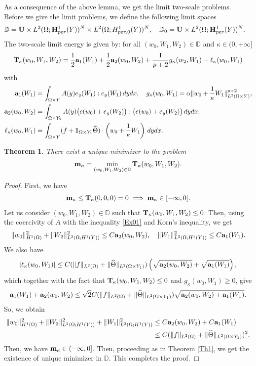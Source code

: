 \documentclass[11pt,a4paper]{article}
\numberwithin{equation}{section}
\def\1{{\bf 1}}
\def\O{\Omega}
\def\Ga{{\bf a}}
\def\D{{\mathbb{D}}}
\def\wh{\widehat }
\def\wt{\widetilde }
\def\X{\times }
\def\Ga{{\bf a}}
\def\Gm{{\bf m}}
\def\GH{{\bf H}}
\def\GT{{\bf T}}
\def\GU{{\bf U}}
\newtheorem{theorem}{Theorem}[section]
\begin{document}
As a consequence of the above lemma, we get the limit two-scale problems. Before we give the limit problems, we define the following limit spaces
\begin{equation*}
	\begin{aligned}
		&\D=\GU\X L^2(\O;\GH^1_{per}(Y))^N\X L^2(\O; H^1_{per,0}(Y))^N,\quad \D_0=\GU \X L^2(\O;\GH^1_{per}(Y))^N.
	\end{aligned}
\end{equation*}
The two-scale limit energy is given by: for all $(w_0,W_1,W_2)\in\D$ and $\kappa\in(0,+\infty]$
\begin{equation}\label{EXE01}
	\GT_\kappa(w_0,W_1,W_2)={1\over 2}\Ga_1(W_1)+{1\over 2}\Ga_2(w_0,W_2)+{1\over p+2}g_\kappa(w_2,W_1)-\ell_\kappa(w_0,W_1)
\end{equation}
with
$$\begin{aligned}
	\Ga_1(W_1)&=\int_{\O\X Y}A(y)e_y(W_1):e_y(W_1)\,dydx,\quad 	g_\kappa(w_0,W_1)=\alpha\|w_0+{1\over \kappa}W_1\|^{p+2}_{L^2(\O\X Y)},\\
	\Ga_2(w_0,W_2)&=\int_{\O\X Y_2} A(y)\big(e(w_0)+e_y(W_2)\big):\big(e(w_0)+e_y(W_2)\big)\,dy dx,\\
	\ell_\kappa(w_0,W_1)&=\int_{\O\X Y}(f+\1_{\O\X Y_1}\wh\Theta)\cdot \left(w_0+{1\over \kappa} W_1\right)\,dydx.
\end{aligned}$$
\begin{theorem}\label{Th3}
	There exist a unique minimizer to the problem
	$$\Gm_\kappa=\min_{(w_0,W_1,W_2)\in\D}\GT_\kappa(w_0,W_1,W_2).$$
\end{theorem}
\begin{proof}
	First, we have
	$$\Gm_\kappa\leq \GT_\kappa(0,0,0)=0 \implies \Gm_\kappa\in[-\infty,0].$$
	Let us consider $(w_0,W_1,W_2)\in \D$ such that $\GT_\kappa(w_0,W_1,W_2)\leq 0$. Then, using the coercivity of $A$ with the inequality \eqref{Ex01} and Korn's inequality, we get
	$$ \|w_0\|^2_{H^1(\O)}+\|W_2\|^2_{L^2(\O;H^1(Y))}\leq C\Ga_2(w_0,W_2),\quad \|W_1\|^2_{L^2(\O;H^1(Y))}\leq C\Ga_1(W_1).$$
	We also have
	$$| \ell_\kappa(w_0,W_1)|\leq C(\|f\|_{L^2(\O)}+\|\wh\Theta\|_{L^2(\O\X Y_1)})\left(\sqrt{\Ga_2(w_0,W_2)}+\sqrt{\Ga_1(W_1)}\right),$$
	which together with the fact that $\GT_\kappa(w_0,W_1,W_2)\leq 0$ and $g_\kappa(w_0,W_1)\geq0$, give
	$$\Ga_1(W_1)+\Ga_2(w_0,W_2)\leq \sqrt{2}C(\|f\|_{L^2(\O)}+\|\wh\Theta\|_{L^2(\O\X Y_1)})\sqrt{\Ga_2(w_0,W_2)+\Ga_1(W_1)}.$$
	So, we obtain
	\begin{equation*}\label{LES01}
		\begin{aligned}
			\|w_0\|^2_{H^1(\O)}+\|W_2\|^2_{L^2(\O;H^1(Y))}+ \|W_1\|^2_{L^2(\O;H^1(Y))}&\leq  C\Ga_2(w_0,W_2)+C\Ga_1(W_1)\\
			&\leq C(\|f\|_{L^2(\O)}+\|\wh\Theta\|_{L^2(\O\X Y_1)})^2.
		\end{aligned}
	\end{equation*}
	Then, we have $\Gm_\kappa\in(-\infty,0]$. Then, proceeding as in Theorem \ref{Th1}, we get the existence of unique minimizer in $\D$. This completes the proof.
\end{proof}
\end{document}
